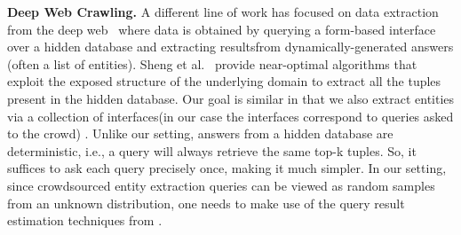 \vspace{3pt}\noindent\textbf{Deep Web Crawling.} A different line of work has focused on data extraction from the deep web~\cite{Jin:2011,Sheng:2012} where data is obtained by querying a form-based interface over a hidden database and extracting results\iftr from dynamically-generated answers (often a list of entities)\fi. Sheng et al.~\cite{Sheng:2012} provide near-optimal algorithms that exploit the exposed structure of the underlying domain to extract all the tuples present in the hidden database. Our goal is similar in that we also extract entities via a collection of interfaces\iftr (in our case the interfaces correspond to queries asked to the crowd)
\fi. Unlike our setting, answers from a hidden database are deterministic, i.e., a query will always retrieve the same top-k tuples. So, it suffices to ask each query precisely once, making it much simpler.
\iftr 
In our setting, since crowdsourced entity extraction queries can be viewed as random samples from an unknown  distribution, one needs to make use of the query result estimation techniques from .
\fi